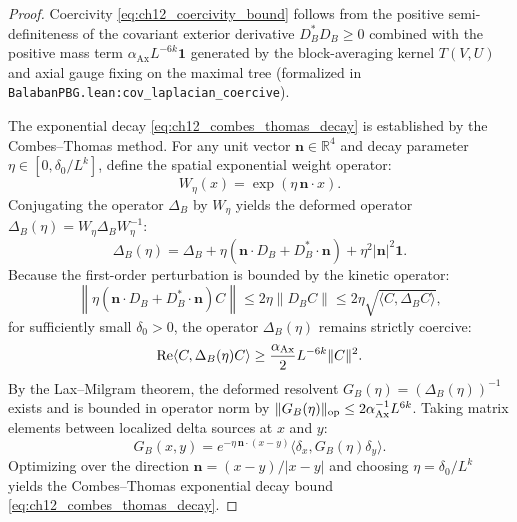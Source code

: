 \begin{proof}
Coercivity \eqref{eq:ch12_coercivity_bound} follows from the positive semi-definiteness of the covariant exterior derivative $D_B^* D_B \ge 0$ combined with the positive mass term $\alpha_{\mathrm{Ax}} L^{-6k} \mathbf{1}$ generated by the block-averaging kernel $T(V, U)$ and axial gauge fixing on the maximal tree (formalized in \texttt{BalabanPBG.lean:cov\_laplacian\_coercive}).

The exponential decay \eqref{eq:ch12_combes_thomas_decay} is established by the Combes--Thomas method. For any unit vector $\mathbf{n} \in \mathbb{R}^4$ and decay parameter $\eta \in [0, \delta_0 / L^k]$, define the spatial exponential weight operator:
\begin{equation}
W_\eta(x) = \exp\left( \eta \, \mathbf{n} \cdot x \right).
\end{equation}
Conjugating the operator $\Delta_B$ by $W_\eta$ yields the deformed operator $\Delta_B(\eta) = W_\eta \Delta_B W_\eta^{-1}$:
\begin{equation}
\Delta_B(\eta) = \Delta_B + \eta \left( \mathbf{n} \cdot D_B + D_B^* \cdot \mathbf{n} \right) + \eta^2 |\mathbf{n}|^2 \mathbf{1}.
\end{equation}
Because the first-order perturbation is bounded by the kinetic operator:
\begin{equation}
\left\| \eta (\mathbf{n} \cdot D_B + D_B^* \cdot \mathbf{n}) C \right\| \le 2 \eta \|D_B C\| \le 2 \eta \sqrt{\langle C, \Delta_B C \rangle},
\end{equation}
for sufficiently small $\delta_0 > 0$, the operator $\Delta_B(\eta)$ remains strictly coercive:
\begin{equation}
\mathrm{Re} \langle C, \Delta_B(\eta) C \rangle \ge \frac{\alpha_{\mathrm{Ax}}}{2} L^{-6k} \|C\|^2.
\end{equation}
By the Lax--Milgram theorem, the deformed resolvent $G_B(\eta) = (\Delta_B(\eta))^{-1}$ exists and is bounded in operator norm by $\|G_B(\eta)\|_{\mathrm{op}} \le 2 \alpha_{\mathrm{Ax}}^{-1} L^{6k}$. Taking matrix elements between localized delta sources at $x$ and $y$:
\begin{equation}
G_B(x, y) = e^{-\eta \, \mathbf{n} \cdot (x - y)} \langle \delta_x, G_B(\eta) \delta_y \rangle.
\end{equation}
Optimizing over the direction $\mathbf{n} = (x - y) / |x - y|$ and choosing $\eta = \delta_0 / L^k$ yields the Combes--Thomas exponential decay bound \eqref{eq:ch12_combes_thomas_decay}.
\end{proof}

